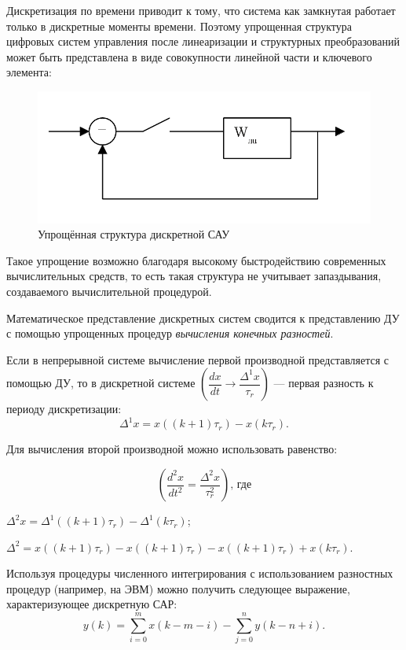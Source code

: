 \documentclass[unicode, 12pt, a4paper, oneside]{article}
\begin{document}
Дискретизация по времени приводит к тому, что система как замкнутая работает только в дискретные моменты времени. Поэтому упрощенная структура цифровых систем управления после линеаризации и структурных преобразований может быть представлена в виде совокупности линейной части и ключевого элемента:

\begin{figure}[H]
\centering
\includegraphics[width=0.5\linewidth]{21_dicret_struct_small.png}
\caption{Упрощённая структура дискретной САУ}
\label{fig:21_dicret_struct_small}
\end{figure}

Такое упрощение возможно благодаря высокому быстродействию современных вычислительных средств, то есть такая структура не учитывает запаздывания, создаваемого вычислительной процедурой.

Математическое представление дискретных систем сводится к представлению ДУ с помощью упрощенных процедур \textit{вычисления конечных разностей}.

Если в непрерывной системе вычисление первой производной представляется с помощью ДУ, то в дискретной системе $ \left( \dfrac{dx}{dt} \rightarrow \dfrac{\Delta^1x}{\tau_r} \right)  $  --- первая разность к периоду дискретизации:
\begin{equation}
\Delta^1x = x((k + 1)\tau_r) - x(k\tau_r).
\end{equation}

Для вычисления второй производной можно использовать равенство:

\begin{equation}
\left( \dfrac{d^2x}{dt^2} = \dfrac{\Delta^2x}{\tau^2_r} \right) \text{, где}
\end{equation}
\par $ \Delta^2x = \Delta^1((k + 1)\tau_r) - \Delta^1(k\tau_r) $;\nopagebreak
\par $ \Delta^2 = x((k + 1)\tau_r) - x((k + 1)\tau_r) - x((k + 1)\tau_r) + x(k\tau_r) $.

Используя процедуры численного интегрирования с использованием разностных процедур (например, на ЭВМ) можно получить следующее выражение, характеризующее дискретную САР:
\begin{equation}
y(k) = \sum_{i=0}^{m} x(k-m-i) - \sum_{j=0}^{n} y(k-n+i).
\end{equation}
\end{document}

